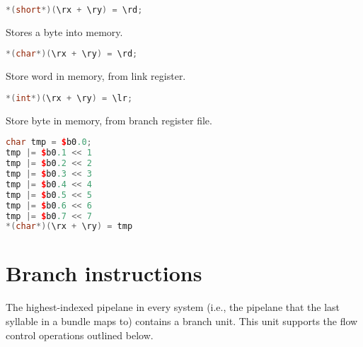 \begin{lstlisting}[numbers=none, basicstyle=\ttfamily\footnotesize, language=C++]
*(short*)(\rx + \ry) = \rd;
\end{lstlisting}

Stores a byte into memory.

\begin{lstlisting}[numbers=none, basicstyle=\ttfamily\footnotesize, language=C++]
*(char*)(\rx + \ry) = \rd;
\end{lstlisting}

Store word in memory, from link register.

\begin{lstlisting}[numbers=none, basicstyle=\ttfamily\footnotesize, language=C++]
*(int*)(\rx + \ry) = \lr;
\end{lstlisting}

Store byte in memory, from branch register file.

\begin{lstlisting}[numbers=none, basicstyle=\ttfamily\footnotesize, language=C++]
char tmp = $b0.0;
tmp |= $b0.1 << 1
tmp |= $b0.2 << 2
tmp |= $b0.3 << 3
tmp |= $b0.4 << 4
tmp |= $b0.5 << 5
tmp |= $b0.6 << 6
tmp |= $b0.7 << 7
*(char*)(\rx + \ry) = tmp
\end{lstlisting}

\section{Branch instructions}

The highest-indexed pipelane in every \rvex{} system (i.e., the pipelane that
the last syllable in a bundle maps to) contains a branch unit. This unit
supports the flow control operations outlined below.

